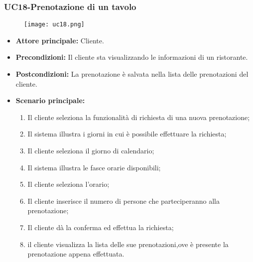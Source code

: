 \subsubsection{UC18-Prenotazione di un tavolo}
\begin{figure}[h] \texttt{[image: uc18.png]} \end{figure}
\begin{itemize}
    \item \textbf{Attore principale: }Cliente.
    \item \textbf{Precondizioni: }Il cliente sta visualizzando le informazioni di un ristorante.
    \item \textbf{Postcondizioni: }La prenotazione è salvata nella lista delle prenotazioni del cliente.
    \item \textbf{Scenario principale:}
        \begin{enumerate}
            \item Il cliente seleziona la funzionalità di richiesta di una nuova prenotazione;
            \item Il sistema illustra i giorni in cui è possibile effettuare la richiesta;
            \item Il cliente seleziona il giorno di calendario;
            \item Il sistema illustra le fasce orarie disponibili;
            \item Il cliente seleziona l'orario;
            \item Il cliente inserisce il numero di persone che parteciperanno alla prenotazione;
            \item Il cliente dà la conferma ed effettua la richiesta;
            \item il cliente visualizza la lista delle sue prenotazioni,ove è presente la prenotazione appena
            effettuata.
        \end{enumerate}
\end{itemize}

